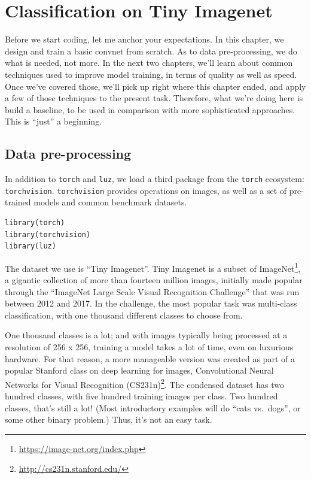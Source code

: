 \documentclass[
  letterpaper,
]{krantz}
\DeclareRobustCommand{\href}[2]{#2\footnote{\url{#1}}}
\begin{document}
\hypertarget{classification-on-tiny-imagenet}{%
\section{Classification on Tiny
Imagenet}\label{classification-on-tiny-imagenet}}

Before we start coding, let me anchor your expectations. In this
chapter, we design and train a basic convnet from scratch. As to data
pre-processing, we do what is needed, not more. In the next two
chapters, we'll learn about common techniques used to improve model
training, in terms of quality as well as speed. Once we've covered
those, we'll pick up right where this chapter ended, and apply a few of
those techniques to the present task. Therefore, what we're doing here
is build a baseline, to be used in comparison with more sophisticated
approaches. This is ``just'' a beginning.

\hypertarget{data-pre-processing}{%
\subsection{Data pre-processing}\label{data-pre-processing}}

In addition to \texttt{torch} and \texttt{luz}, we load a third package
from the \texttt{torch} ecosystem: \texttt{torchvision}.
\texttt{torchvision} provides operations on images, as well as a set of
pre-trained models and common benchmark datasets.

\begin{verbatim}
library(torch)
library(torchvision)
library(luz)
\end{verbatim}

The dataset we use is ``Tiny Imagenet''. Tiny Imagenet is a subset of
\href{https://image-net.org/index.php}{ImageNet}, a gigantic collection
of more than fourteen million images, initially made popular through the
``ImageNet Large Scale Visual Recognition Challenge'' that was run
between 2012 and 2017. In the challenge, the most popular task was
multi-class classification, with one thousand different classes to
choose from.

One thousand classes is a lot; and with images typically being processed
at a resolution of 256 x 256, training a model takes a lot of time, even
on luxurious hardware. For that reason, a more manageable version was
created as part of a popular Stanford class on deep learning for images,
\href{http://cs231n.stanford.edu/}{Convolutional Neural Networks for
Visual Recognition (CS231n)}. The condensed dataset has two hundred
classes, with five hundred training images per class. Two hundred
classes, that's still a lot! (Most introductory examples will do ``cats
vs.~dogs'', or some other binary problem.) Thus, it's not an easy task.
\end{document}
